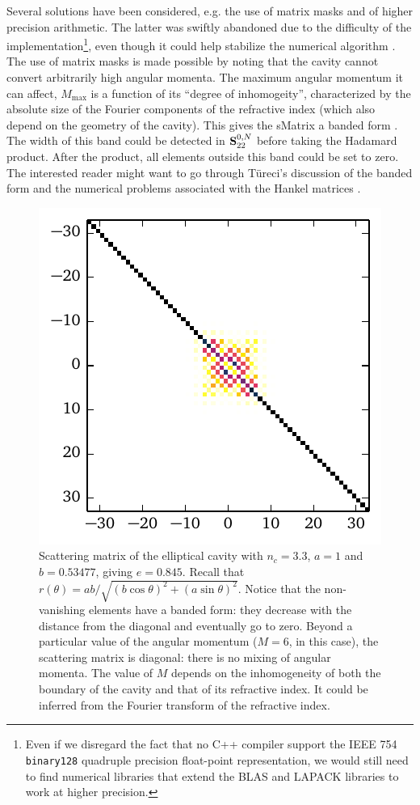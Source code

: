 Several solutions have been considered, e.g. the use of matrix masks
and of higher precision arithmetic. The latter was swiftly abandoned
due to the difficulty of the implementation\footnote{Even if we disregard
the fact that no C++ compiler support the IEEE 754 \texttt{binary128}
quadruple precision float-point representation, we would still need
to find numerical libraries that extend the BLAS and LAPACK libraries
to work at higher precision.}, even though it could help stabilize the
numerical algorithm \cite[\S 5.8.4]{MIS2002}. The use of matrix masks is 
made possible by noting that the cavity cannot convert arbitrarily
high angular momenta. The maximum angular momentum it can affect, 
$M_\text{max}$ is a function of its ``degree of inhomogeity'', 
characterized by the absolute size of the Fourier components
of the refractive index (which also depend on the geometry
of the cavity). This gives the \gls{sMatrix} a banded form . The width of
this band could be detected in $\mathbf{S}^{0,N}_{22}$ before
taking the Hadamard product. After the product, all elements
outside this band could be set to zero. The interested 
reader might want to go through Türeci's discussion of
the banded form and the numerical problems associated 
with the Hankel matrices \cite[\S 3.4]{TUR2003}.

\begin{figure}
 \centering
 \includegraphics{figs/passive/sMatrixEllipseMag.pdf}
 \caption[Banded form of the scattering matrix of the elliptical cavity]
	 {Scattering matrix of the elliptical cavity with $n_c=3.3$, $a=1$
	 and $b=0.53477$, giving $e=0.845$. Recall that $r(\theta)=ab/\sqrt{(b\cos\theta)^2+(a\sin\theta)^2}$.
	 Notice that the non-vanishing elements have a banded form: they decrease with the distance
	 from the diagonal and eventually go to zero. Beyond a particular value of the angular momentum 
	 ($M=6$, in this case), the scattering matrix is diagonal: there is no mixing of angular momenta.
	 The value of $M$ depends on the inhomogeneity of both the boundary of the cavity and that of its
	 refractive index. It could be inferred from the Fourier transform of the refractive index.}
\end{figure}

